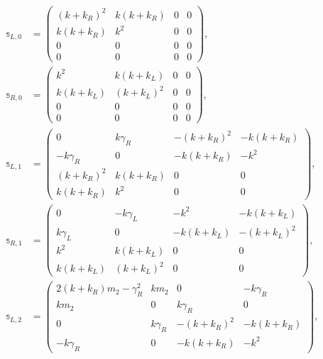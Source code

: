 %
%
\begingroup
\allowdisplaybreaks
\begin{align}
    \mathbb{s}_{L,0} &=
    \left(
    \begin{array}{cccc}
      (k+k_R)^2 & k (k+k_R) & 0 & 0 \\
      k (k+k_R) & k^2 & 0 & 0 \\
      0 & 0 & 0 & 0 \\
      0 & 0 & 0 & 0
    \end{array}
    \right),
    \nonumber\\
    \mathbb{s}_{R,0} & =
    \left(
    \begin{array}{cccc}
      k^2 & k (k+k_L) & 0 & 0 \\
      k (k+k_L) & (k+k_L)^2 & 0 & 0 \\
      0 & 0 & 0 & 0 \\
      0 & 0 & 0 & 0
    \end{array}
    \right),
    \nonumber\\
    \mathbb{s}_{L,1} &= \left(
    \begin{array}{cccc}
      0 & k \gamma_R & -(k+k_R)^2 & -k (k+k_R) \\
      -k \gamma_R & 0 & -k (k+k_R) & -k^2 \\
      (k+k_R)^2 & k (k+k_R) & 0 & 0 \\
      k (k+k_R) & k^2 & 0 & 0
    \end{array}
    \right),
    \nonumber\\
    \mathbb{s}_{R,1} & = \left(
    \begin{array}{cccc}
      0 & -k \gamma_L & -k^2 & -k (k+k_L) \\
      k \gamma_L & 0 & -k (k+k_L) & -(k+k_L)^2 \\
      k^2 & k (k+k_L) & 0 & 0 \\
      k (k+k_L) & (k+k_L)^2 & 0 & 0
    \end{array}
    \right),
    \nonumber\\
    \mathbb{s}_{L,2} &= \left(
    \begin{array}{cccc}
      2 (k+k_R) m_2-\gamma_R^2 & k m_2 & 0 & -k \gamma_R \\
      k m_2 & 0 & k \gamma_R & 0 \\
      0 & k \gamma_R & -(k+k_R)^2 & -k (k+k_R) \\
      -k \gamma_R & 0 & -k (k+k_R) & -k^2
    \end{array}
    \right),
    \nonumber\\

\end{align}
